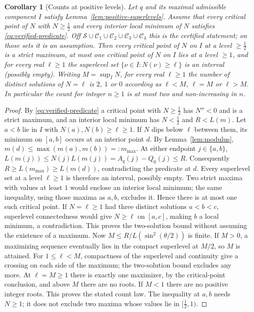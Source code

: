 \documentclass[11pt]{article}
\newtheorem{corollary}[theorem]{Corollary}
\theoremstyle{remark}
\begin{document}
\begin{corollary}[Counts at positive levels]\label{cor:verified-counts}
Let $q$ and its maximal admissible component $I$ satisfy
Lemma~\ref{lem:positive-superlevels}.  Assume that every critical
point of $N$ with $N\ge\tfrac12$ and every
interior local minimum of $N$ satisfies \eqref{eq:verified-predicate}.
Off $\mathcal S\cup\mathcal C_1\cup\mathcal C_2\cup\mathcal C_3\cup\mathcal C_4$
this is the certified statement; on those sets it is an assumption.  Then
every critical point of $N$ on $I$ at a level $\ge\tfrac12$ is a strict
maximum, at most one critical point of $N$ on $I$ lies at a level $\ge1$,
and for every real $\ell\ge1$ the superlevel set
$\{\nu\in I:N(\nu)\ge\ell\}$ is an interval (possibly empty).
Writing $M=\sup_I N$, for every real $\ell\ge1$ the number of
distinct solutions of $N=\ell$ is $2$, $1$ or $0$ according as
$\ell<M$, $\ell=M$ or $\ell>M$.  In particular the count for
integer $n\ge1$ is at most two and non-increasing in $n$.
\end{corollary}
\begin{proof}
By \eqref{eq:verified-predicate} a critical point with $N\ge\tfrac12$ has
$N''<0$ and is a strict maximum, and an interior local minimum has
$N<\tfrac12$ and $R<L(m)$.  Let $a<b$ lie in $I$ with
$N(a),N(b)\ge\ell\ge1$.  If $N$ dips below $\ell$ between them,
its minimum on $[a,b]$ occurs at an interior point $d$.  By
Lemma~\ref{lem:modulus}, $m(d)\le\max(m(a),m(b))=:m_{\max}$.  At either
endpoint $j\in\{a,b\}$,
$L(m(j))\le N(j)L(m(j))=A_q(j)-Q_0(j)\le R$.  Consequently
$R\ge L(m_{\max})\ge L(m(d))$, contradicting the predicate at $d$.
Every superlevel set at a level $\ell\ge1$ is therefore an interval,
possibly empty.  Two strict maxima with values at least $1$ would
enclose an interior local minimum; the same inequality, using those
maxima as $a,b$, excludes it.  Hence there is at most one such
critical point.  If $N=\ell\ge1$ had three distinct solutions
$a<b<c$, superlevel connectedness would give $N\ge\ell$ on $[a,c]$,
making $b$ a local minimum, a contradiction.  This proves the
two-solution bound without assuming the existence of a maximum.
Now $M\le R/L(\sin^2(\theta/2))$ is finite.  If $M>0$, a maximizing sequence
eventually lies in the compact superlevel at $M/2$, so $M$ is
attained.  For $1\le\ell<M$, compactness of the superlevel and
continuity give a crossing on each side of the maximum; the
two-solution bound excludes any more.  At $\ell=M\ge1$ there is
exactly one maximizer, by the critical-point conclusion, and above
$M$ there are no roots.  If $M<1$ there are no positive integer
roots.  This proves the stated count law.
The inequality at $a,b$ needs $N\ge1$; it does not exclude two
maxima whose values lie in $[\tfrac12,1)$.
\end{proof}
\end{document}
